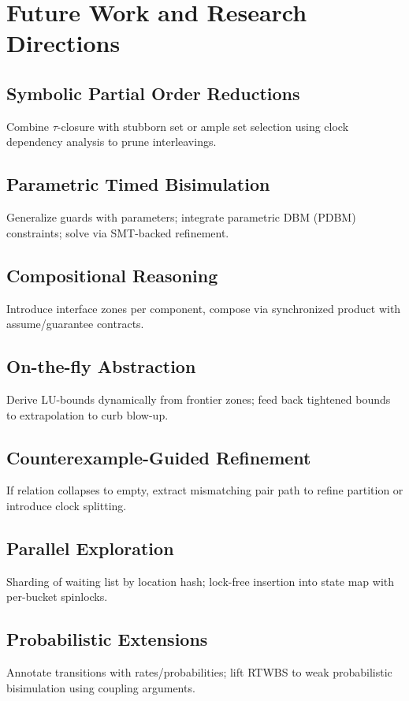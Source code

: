 \section{Future Work and Research Directions}
\subsection{Symbolic Partial Order Reductions}
Combine $\tau$-closure with stubborn set or ample set selection using clock dependency analysis to prune interleavings.

\subsection{Parametric Timed Bisimulation}
Generalize guards with parameters; integrate parametric DBM (PDBM) constraints; solve via SMT-backed refinement.

\subsection{Compositional Reasoning}
Introduce interface zones per component, compose via synchronized product with assume/guarantee contracts.

\subsection{On-the-fly Abstraction}
Derive LU-bounds dynamically from frontier zones; feed back tightened bounds to extrapolation to curb blow-up.

\subsection{Counterexample-Guided Refinement}
If relation collapses to empty, extract mismatching pair path to refine partition or introduce clock splitting.

\subsection{Parallel Exploration}
Sharding of waiting list by location hash; lock-free insertion into state map with per-bucket spinlocks.

\subsection{Probabilistic Extensions}
Annotate transitions with rates/probabilities; lift RTWBS to weak probabilistic bisimulation using coupling arguments.

